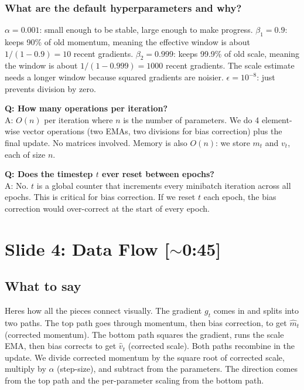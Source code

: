 \documentclass[11pt, letterpaper]{article}
\begin{document}
\begin{deepdive}
\subsubsection{What are the default hyperparameters and why?}
$\alpha = 0.001$: small enough to be stable, large enough to make progress. $\beta_1 = 0.9$: keeps 90\% of old momentum, meaning the effective window is about $1/(1-0.9) = 10$ recent gradients. $\beta_2 = 0.999$: keeps 99.9\% of old scale, meaning the window is about $1/(1-0.999) = 1000$ recent gradients. The scale estimate needs a longer window because squared gradients are noisier. $\epsilon = 10^{-8}$: just prevents division by zero.
\end{deepdive}

\begin{qabox}
\textbf{Q: How many operations per iteration?}\\
A: $O(n)$ per iteration where $n$ is the number of parameters. We do 4 element-wise vector operations (two EMAs, two divisions for bias correction) plus the final update. No matrices involved. Memory is also $O(n)$: we store $m_t$ and $v_t$, each of size $n$.

\textbf{Q: Does the timestep $t$ ever reset between epochs?}\\
A: No. $t$ is a global counter that increments every minibatch iteration across all epochs. This is critical for bias correction. If we reset $t$ each epoch, the bias correction would over-correct at the start of every epoch.
\end{qabox}


\section{Slide 4: Data Flow \textnormal{\color{muted}[$\sim$0:45]}}

\subsection{What to say}

Heres how all the pieces connect visually. The gradient $g_t$ comes in and splits into two paths. The top path goes through momentum, then bias correction, to get $\hat{m}_t$ (corrected momentum). The bottom path squares the gradient, runs the scale EMA, then bias corrects to get $\hat{v}_t$ (corrected scale). Both paths recombine in the update. We divide corrected momentum by the square root of corrected scale, multiply by $\alpha$ (step-size), and subtract from the parameters. The direction comes from the top path and the per-parameter scaling from the bottom path.
\end{document}
